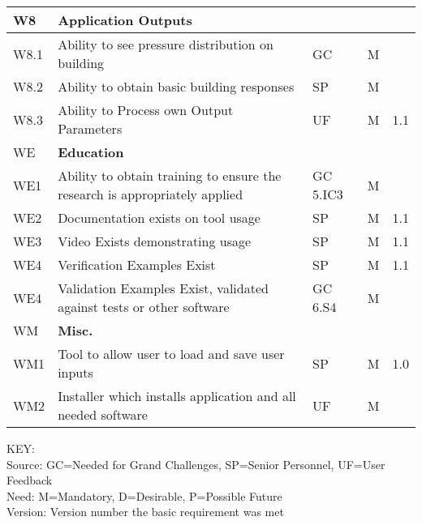 \begin{longtable}{| p{} | p{} | p{} | p{} |  p{} |}



    W8 & \textbf{Application Outputs} &  & & \\ \hline
    W8.1 & Ability to see pressure distribution on building & GC & M &   \\ \hline
    W8.2 & Ability to obtain basic building responses & SP & M &   \\ \hline
    W8.3 & Ability to Process own Output Parameters & UF & M & 1.1  \\ \hhline{=====}
    WE & \textbf{Education} &  &  & \\ \hline
    WE1 & Ability to obtain training to ensure the research is appropriately applied & GC 5.IC3 & M & \\ \hline 
    WE2 & Documentation exists on tool usage & SP & M & 1.1  \\ \hline
    WE3 & Video Exists demonstrating usage & SP & M & 1.1  \\ \hline
    WE4 & Verification Examples Exist & SP & M & 1.1  \\ \hline
    WE4 & Validation Examples Exist, validated against tests or other software & GC 6.S4 & M &  \\\hhline{=====}
    WM & \textbf{Misc.} &  &  & \\ \hline
    WM1 & Tool to allow user to load and save user inputs & SP & M & 1.0 \\ \hline
    WM2 & Installer which installs application and all needed software & UF & M &   \\ \hline
	\bottomrule 
               
\end{longtable}

\noindent
KEY:\\
Source: GC=Needed for Grand Challenges, SP=Senior Personnel, UF=User Feedback \\
Need: M=Mandatory, D=Desirable, P=Possible Future \\
Version: Version number the basic requirement was met 


